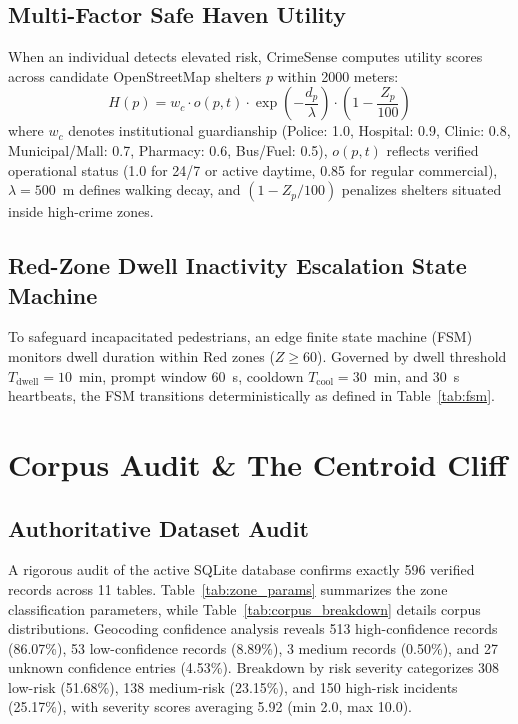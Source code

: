\documentclass[conference]{IEEEtran}
\begin{document}
\subsection{Multi-Factor Safe Haven Utility}
When an individual detects elevated risk, CrimeSense computes utility scores across candidate OpenStreetMap shelters $p$ within 2000 meters:
\begin{equation}
H(p) = w_c \cdot o(p, t) \cdot \exp\left(-\frac{d_p}{\lambda}\right) \cdot \left(1 - \frac{Z_p}{100}\right)
\label{eq:safe_haven}
\end{equation}
where $w_c$ denotes institutional guardianship (Police: 1.0, Hospital: 0.9, Clinic: 0.8, Municipal/Mall: 0.7, Pharmacy: 0.6, Bus/Fuel: 0.5), $o(p, t)$ reflects verified operational status (1.0 for 24/7 or active daytime, 0.85 for regular commercial), $\lambda = 500$~m defines walking decay, and $(1 - Z_p / 100)$ penalizes shelters situated inside high-crime zones.

\subsection{Red-Zone Dwell Inactivity Escalation State Machine}
To safeguard incapacitated pedestrians, an edge finite state machine (FSM) monitors dwell duration within Red zones ($Z \ge 60$). Governed by dwell threshold $T_{\text{dwell}} = 10$~min, prompt window 60~s, cooldown $T_{\text{cool}} = 30$~min, and 30~s heartbeats, the FSM transitions deterministically as defined in Table~\ref{tab:fsm}.

\section{Corpus Audit \& The Centroid Cliff}
\subsection{Authoritative Dataset Audit}
A rigorous audit of the active SQLite database confirms exactly 596 verified records across 11 tables. Table~\ref{tab:zone_params} summarizes the zone classification parameters, while Table~\ref{tab:corpus_breakdown} details corpus distributions. Geocoding confidence analysis reveals 513 high-confidence records (86.07\%), 53 low-confidence records (8.89\%), 3 medium records (0.50\%), and 27 unknown confidence entries (4.53\%). Breakdown by risk severity categorizes 308 low-risk (51.68\%), 138 medium-risk (23.15\%), and 150 high-risk incidents (25.17\%), with severity scores averaging 5.92 (min 2.0, max 10.0).
\end{document}
